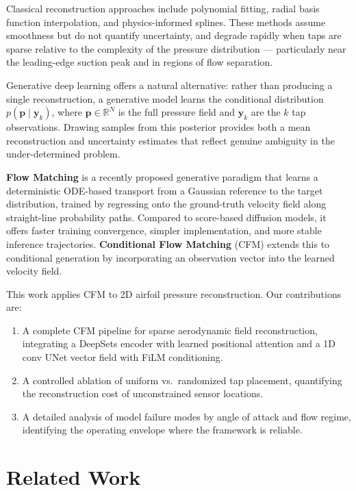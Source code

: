 \documentclass[12pt]{article}
\begin{document}
Classical reconstruction approaches include polynomial fitting, radial basis
function interpolation, and physics-informed splines. These methods assume
smoothness but do not quantify uncertainty, and degrade rapidly when taps are
sparse relative to the complexity of the pressure distribution — particularly
near the leading-edge suction peak and in regions of flow separation.

Generative deep learning offers a natural alternative: rather than producing a
single reconstruction, a generative model learns the conditional distribution
$p(\mathbf{p} \mid \mathbf{y}_k)$, where $\mathbf{p} \in \mathbb{R}^N$ is the
full pressure field and $\mathbf{y}_k$ are the $k$ tap observations. Drawing
samples from this posterior provides both a mean reconstruction and uncertainty
estimates that reflect genuine ambiguity in the under-determined problem.

\textbf{Flow Matching} \citep{lipman2022flow} is a recently proposed generative
paradigm that learns a deterministic ODE-based transport from a Gaussian
reference to the target distribution, trained by regressing onto the
ground-truth velocity field along straight-line probability paths. Compared to
score-based diffusion models, it offers faster training convergence, simpler
implementation, and more stable inference trajectories. \textbf{Conditional Flow
Matching} (CFM) \citep{albergo2022building} extends this to conditional generation
by incorporating an observation vector into the learned velocity field.

This work applies CFM to 2D airfoil pressure reconstruction. Our contributions
are:
\begin{enumerate}
    \item A complete CFM pipeline for sparse aerodynamic field reconstruction,
          integrating a DeepSets encoder with learned positional attention and a
          1D conv UNet vector field with FiLM conditioning.
    \item A controlled ablation of uniform vs.\ randomized tap placement,
          quantifying the reconstruction cost of unconstrained sensor locations.
    \item A detailed analysis of model failure modes by angle of attack and
          flow regime, identifying the operating envelope where the framework
          is reliable.
\end{enumerate}

\section{Related Work}
\label{sec:related}
\end{document}
